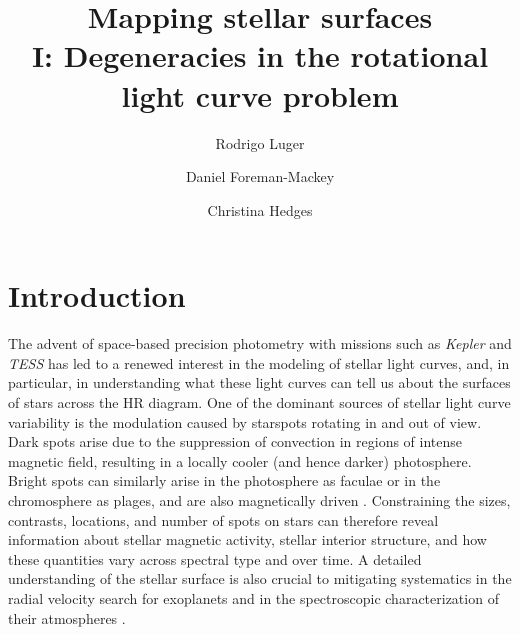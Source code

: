 \documentclass[modern]{aastex62}
\begin{document}
\title{%
    \textbf{
        Mapping stellar surfaces\\
        I: Degeneracies in the rotational light curve problem
    }
}

\author[0000-0002-0296-3826]{Rodrigo Luger}
%
\author[0000-0002-9328-5652]{Daniel Foreman-Mackey}
%
\author[0000-0002-3385-8391]{Christina Hedges}
%



\begin{abstract}
\end{abstract}

\section{Introduction}
\label{sec:intro}

The advent of space-based precision photometry with missions such as
\emph{Kepler} \citep{Borucki2010} and \emph{TESS} \citep{Ricker2015}
has led to a renewed interest in the modeling of stellar light curves,
and, in particular, in understanding what these light curves can tell
us about the surfaces of stars across the HR diagram. One of the dominant
sources of stellar light curve variability is the modulation caused
by starspots rotating in and out of view.
Dark spots arise due to the suppression of convection in regions of
intense magnetic field, resulting in a locally cooler (and hence darker)
photosphere. Bright spots can similarly
arise in the photosphere as faculae or in the chromosphere as plages, and
are also magnetically driven \citep[e.g.,][]{Berdyugina2005}.
%
Constraining the sizes,
contrasts, locations, and number of spots on stars can therefore reveal
information about stellar magnetic activity, stellar interior structure,
and how these quantities vary across spectral type and over time.
A detailed understanding of the stellar surface is also crucial to
mitigating systematics in the radial velocity search for exoplanets
\citep[e.g.,][]{Lanza2011} and in the spectroscopic characterization of their
atmospheres \citep[e.g.,][]{Rackham2018}.
\end{document}
